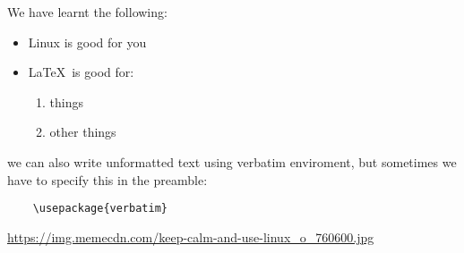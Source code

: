 \documentclass[12pt]{article}
\begin{document}
We have learnt the following:
\begin{itemize}
\item Linux is good for you
\item \LaTeX \ is good for:
	\begin{enumerate}
	\item things
	\item other things
	\end{enumerate}
\end{itemize}

we can also write unformatted text using verbatim enviroment, but sometimes we have to specify this in the preamble:

\begin{verbatim}
	\usepackage{verbatim}
\end{verbatim}








\begin{thebibliography}{9}

	\url{https://img.memecdn.com/keep-calm-and-use-linux_o_760600.jpg}
  

\end{thebibliography}
\end{document}

